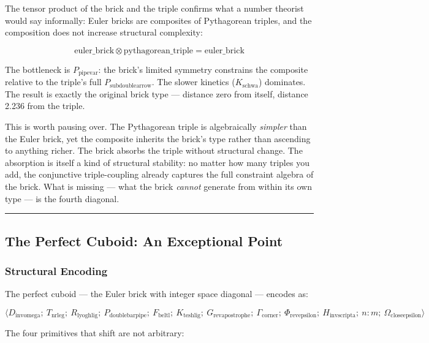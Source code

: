 \documentclass[12pt,a4paper]{article}
\begin{document}
The tensor product of the brick and the triple confirms what a number theorist would say informally: Euler bricks are composites of Pythagorean triples, and the composition does not increase structural complexity:

\[\text{euler\_brick} \otimes \text{pythagorean\_triple} = \text{euler\_brick}\]

The bottleneck is $P_{\text{pipevar}}$: the brick's limited symmetry constrains the composite relative to the triple's full $P_{\text{subdoublearrow}}$. The slower kinetics ($K_{\text{schwa}}$) dominates. The result is exactly the original brick type --- distance zero from itself, distance 2.236 from the triple.

This is worth pausing over. The Pythagorean triple is algebraically \emph{simpler} than the Euler brick, yet the composite inherits the brick's type rather than ascending to anything richer. The brick absorbs the triple without structural change. The absorption is itself a kind of structural stability: no matter how many triples you add, the conjunctive triple-coupling already captures the full constraint algebra of the brick. What is missing --- what the brick \emph{cannot} generate from within its own type --- is the fourth diagonal.

\begin{center}
\rule{0.5\textwidth}{0.4pt}
\end{center}

\subsection{The Perfect Cuboid: An Exceptional Point}

\subsubsection{Structural Encoding}

The perfect cuboid --- the Euler brick with integer space diagonal --- encodes as:

\[\langle D_{\text{invomega}};\ T_{\text{nrleg}};\ R_{\text{lyoghlig}};\ P_{\text{doublebarpipe}};\ F_{\text{beltl}};\ K_{\text{teshlig}};\ G_{\text{revapostrophe}};\ \Gamma_{\text{corner}};\ \Phi_{\text{revepsilon}};\ H_{\text{invscripta}};\ n{:}m;\ \Omega_{\text{closeepsilon}} \rangle\]

The four primitives that shift are not arbitrary:
\end{document}

